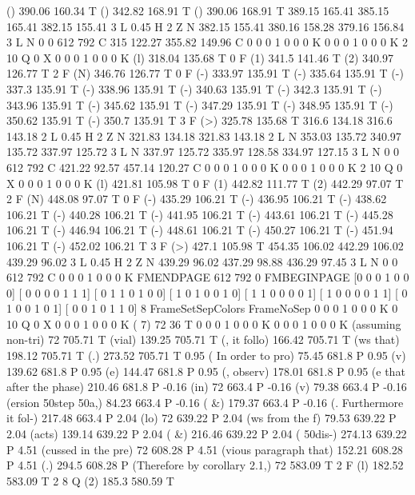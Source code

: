 () 390.06 160.34 T
() 342.82 168.91 T
() 390.06 168.91 T
389.15 165.41 385.15 165.41 382.15 155.41 3 L
0.45 H
2 Z
N
382.15 155.41 380.16 158.28 379.16 156.84 3 L
N
0 0 612 792 C
315 122.27 355.82 149.96 C
0 0 0 1 0 0 0 K
0 0 0 1 0 0 0 K
2 10 Q
0 X
0 0 0 1 0 0 0 K
(l) 318.04 135.68 T
0 F
(1) 341.5 141.46 T
(2) 340.97 126.77 T
2 F
(N) 346.76 126.77 T
0 F
(-) 333.97 135.91 T
(-) 335.64 135.91 T
(-) 337.3 135.91 T
(-) 338.96 135.91 T
(-) 340.63 135.91 T
(-) 342.3 135.91 T
(-) 343.96 135.91 T
(-) 345.62 135.91 T
(-) 347.29 135.91 T
(-) 348.95 135.91 T
(-) 350.62 135.91 T
(-) 350.7 135.91 T
3 F
(>) 325.78 135.68 T
316.6 134.18 316.6 143.18 2 L
0.45 H
2 Z
N
321.83 134.18 321.83 143.18 2 L
N
353.03 135.72 340.97 135.72 337.97 125.72 3 L
N
337.97 125.72 335.97 128.58 334.97 127.15 3 L
N
0 0 612 792 C
421.22 92.57 457.14 120.27 C
0 0 0 1 0 0 0 K
0 0 0 1 0 0 0 K
2 10 Q
0 X
0 0 0 1 0 0 0 K
(l) 421.81 105.98 T
0 F
(1) 442.82 111.77 T
(2) 442.29 97.07 T
2 F
(N) 448.08 97.07 T
0 F
(-) 435.29 106.21 T
(-) 436.95 106.21 T
(-) 438.62 106.21 T
(-) 440.28 106.21 T
(-) 441.95 106.21 T
(-) 443.61 106.21 T
(-) 445.28 106.21 T
(-) 446.94 106.21 T
(-) 448.61 106.21 T
(-) 450.27 106.21 T
(-) 451.94 106.21 T
(-) 452.02 106.21 T
3 F
(>) 427.1 105.98 T
454.35 106.02 442.29 106.02 439.29 96.02 3 L
0.45 H
2 Z
N
439.29 96.02 437.29 98.88 436.29 97.45 3 L
N
0 0 612 792 C
0 0 0 1 0 0 0 K
FMENDPAGE
612 792 0 FMBEGINPAGE
[0 0 0 1 0 0 0]
[ 0 0 0 0 1 1 1]
[ 0 1 1 0 1 0 0]
[ 1 0 1 0 0 1 0]
[ 1 1 0 0 0 0 1]
[ 1 0 0 0 0 1 1]
[ 0 1 0 0 1 0 1]
[ 0 0 1 0 1 1 0]
 8 FrameSetSepColors
FrameNoSep
0 0 0 1 0 0 0 K
0 10 Q
0 X
0 0 0 1 0 0 0 K
(                                                                                        7) 72 36 T
0 0 0 1 0 0 0 K
0 0 0 1 0 0 0 K
(assuming non-tri) 72 705.71 T
(vial) 139.25 705.71 T
(, it follo) 166.42 705.71 T
(ws that) 198.12 705.71 T
(.) 273.52 705.71 T
0.95 ( In order to pro) 75.45 681.8 P
0.95 (v) 139.62 681.8 P
0.95 (e) 144.47 681.8 P
0.95 (, observ) 178.01 681.8 P
0.95 (e that after the phase) 210.46 681.8 P
-0.16 (in) 72 663.4 P
-0.16 (v) 79.38 663.4 P
-0.16 (ersion \050step \050a,) 84.23 663.4 P
-0.16 ( &) 179.37 663.4 P
-0.16 (. Furthermore it fol-) 217.48 663.4 P
2.04 (lo) 72 639.22 P
2.04 (ws from the f) 79.53 639.22 P
2.04 (acts) 139.14 639.22 P
2.04 ( &) 216.46 639.22 P
2.04 ( \050dis-) 274.13 639.22 P
4.51 (cussed in the pre) 72 608.28 P
4.51 (vious paragraph that) 152.21 608.28 P
4.51 (.) 294.5 608.28 P
(Therefore by corollary 2.1,) 72 583.09 T
2 F
(l) 182.52 583.09 T
2 8 Q
(2) 185.3 580.59 T
